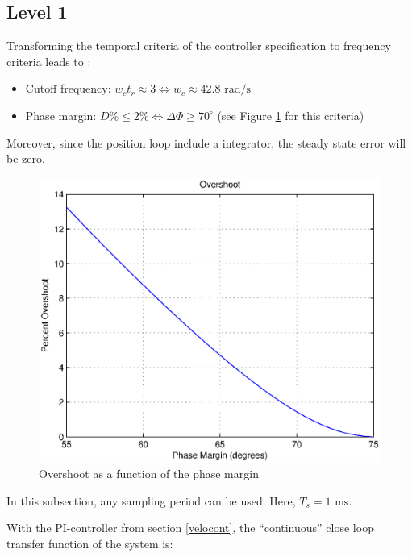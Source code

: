 \subsection*{Level 1}


Transforming the temporal criteria of the controller specification to frequency criteria leads to :
\begin{itemize}
 \item Cutoff frequency: $w_c t_r \approx 3 \Leftrightarrow w_c \approx 42.8 \text{ rad/s}$
 \item Phase margin: $D\% \leq 2\% \Leftrightarrow \Delta \Phi \geq 70^{\circ}$ (see Figure \ref{overshootMargin} for this criteria)
\end{itemize}

Moreover, since the position loop include a integrator, the steady state error will be zero.

\begin{center}
\begin{figure}[ht]
 \includegraphics[width=\linewidth]{fig/overshootMargin.eps}
 \caption{Overshoot as a function of the phase margin}
 \label{overshootMargin}
\end{figure}
\end{center}

In this subsection, any sampling period can be used. Here, $T_s = 1 \text{ ms}$.

With the PI-controller from section \ref{velocont}, the ``continuous'' close loop transfer function of the system is:

